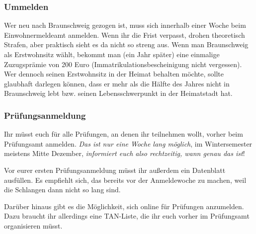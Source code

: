 \begin{multicols}{2}
\subsubsection{Ummelden}
	\label{todoummelden}

	Wer neu nach Braunschweig gezogen ist, muss sich innerhalb einer Woche beim Einwohnermeldeamt anmelden. Wenn ihr die Frist verpasst, drohen theoretisch Strafen, aber praktisch sieht es da nicht so streng aus. Wenn man Braunschweig als Erstwohnsitz wählt, bekommt man (ein Jahr später) eine einmalige Zuzugsprämie von 200 Euro (Immatrikulationsbescheinigung nicht vergessen). Wer dennoch seinen Erstwohnsitz in der Heimat behalten möchte, sollte glaubhaft darlegen können, dass er mehr als die Hälfte des Jahres nicht in Braunschweig lebt bzw. seinen Lebensschwerpunkt in der Heimatstadt hat.

\subsubsection{Prüfungsanmeldung}
	\label{todoanmeldung}

	Ihr müsst euch für alle Prüfungen, an denen ihr teilnehmen wollt, vorher beim Prüfungsamt anmelden. \emph{Das ist nur eine Woche lang möglich}, im Wintersemester meistens Mitte Dezember, \emph{informiert euch also rechtzeitig, wann genau das ist}!

	Vor eurer ersten Prüfungsanmeldung müsst ihr außerdem ein Datenblatt ausfüllen. Es empfiehlt sich, das bereits vor der Anmeldewoche zu machen, weil die Schlangen dann nicht so lang sind.

	Darüber hinaus gibt es die Möglichkeit, sich online für Prüfungen anzumelden. Dazu braucht ihr allerdings eine TAN-Liste, die ihr euch vorher im Prüfungsamt organisieren müsst.
\end{multicols}